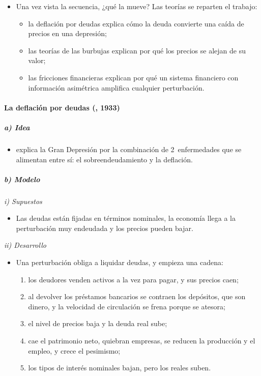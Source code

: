 \documentclass[11pt]{article}
\begin{document}
\begin{itemize}
\item Una vez vista la secuencia, ¿qué la mueve? Las teorías se reparten el trabajo:
  \begin{itemize}
  \item la deflación por deudas explica cómo la deuda convierte una caída de precios en una depresión;
  \item las teorías de las burbujas explican por qué los precios se alejan de su valor;
  \item las fricciones financieras explican por qué un sistema financiero con información asimétrica amplifica cualquier perturbación.
  \end{itemize}
\end{itemize}

\paragraph{La deflación por deudas (, 1933)}

\subparagraph{a) Idea}

\begin{itemize}
\item \textcite{Fisher1933} explica la Gran Depresión por la combinación de 2~enfermedades que se alimentan entre sí: el sobreendeudamiento y la deflación.
\end{itemize}

\subparagraph{b) Modelo}

\hspace*{3.6em}\emph{i) Supuestos}

\begin{itemize}
\item Las deudas están fijadas en términos nominales, la economía llega a la perturbación muy endeudada y los precios pueden bajar.
\end{itemize}

\hspace*{3.6em}\emph{ii) Desarrollo}

\begin{itemize}
\item Una perturbación obliga a liquidar deudas, y empieza una cadena:
  \begin{enumerate}
  \item los deudores venden activos a la vez para pagar, y sus precios caen;
  \item al devolver los préstamos bancarios se contraen los depósitos, que son dinero, y la velocidad de circulación se frena porque se atesora;
  \item el nivel de precios baja y la deuda real sube;
  \item cae el patrimonio neto, quiebran empresas, se reducen la producción y el empleo, y crece el pesimismo;
  \item los tipos de interés nominales bajan, pero los reales suben.
  \end{enumerate}
\end{itemize}
\end{document}

